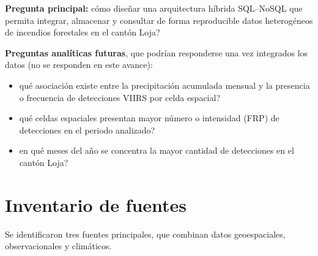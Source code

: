 \documentclass[11pt,a4paper]{article}
\begin{document}
\textbf{Pregunta principal:} \textquestiondown c\'omo dise\~nar una arquitectura h\'ibrida SQL--NoSQL que permita integrar, almacenar y consultar de forma reproducible datos heterog\'eneos de incendios forestales en el cant\'on Loja?

\textbf{Preguntas anal\'iticas futuras}, que podr\'ian responderse una vez integrados los datos (no se responden en este avance):
\begin{itemize}
    \item \textquestiondown qu\'e asociaci\'on existe entre la precipitaci\'on acumulada mensual y la presencia o frecuencia de detecciones VIIRS por celda espacial?
    \item \textquestiondown qu\'e celdas espaciales presentan mayor n\'umero o intensidad (FRP) de detecciones en el periodo analizado?
    \item \textquestiondown en qu\'e meses del a\~no se concentra la mayor cantidad de detecciones en el cant\'on Loja?
\end{itemize}

\section{Inventario de fuentes}

Se identificaron tres fuentes principales, que combinan datos geoespaciales, observacionales y clim\'aticos.
\end{document}
